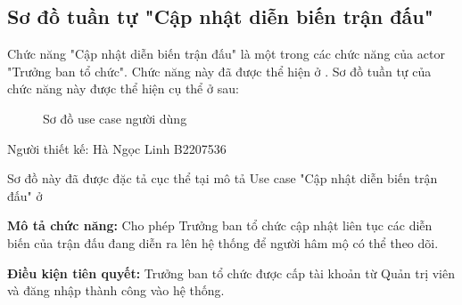 \subsection{Sơ đồ tuần tự "Cập nhật diễn biến trận đấu"}
\setcounter{figure}{0}

Chức năng "Cập nhật diễn biến trận đấu" là một trong các chức năng của actor
"Trưởng ban tổ chức". Chức năng này đã được thể hiện ở \myref{}.
Sơ đồ tuần tự của chức năng này được thể hiện cụ thể ở  sau:

\begin{figure}[H]
      \centering
      
      \caption{Sơ đồ use case người dùng}
      \label{fig:sd-2}
\end{figure}

Người thiết kế: Hà Ngọc Linh B2207536

Sơ đồ này đã được đặc tả cục thể tại mô tả Use case
"Cập nhật diễn biến trận đấu" ở 

\noindent
\textbf{Mô tả chức năng:} Cho phép Trưởng ban tổ chức cập nhật liên tục các diễn biến của trận đấu đang diễn ra lên hệ thống để người hâm mộ có thể theo dõi.

\noindent
\textbf{Điều kiện tiên quyết:} Trưởng ban tổ chức được cấp tài khoản từ Quản trị viên và đăng nhập thành công vào hệ thống.

